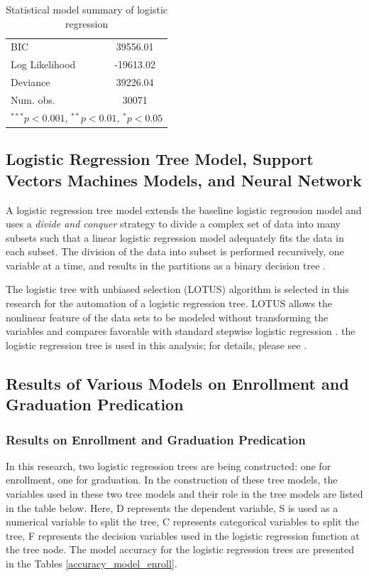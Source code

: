 \documentclass[12pt,english]{report}
\begin{document}
\begin{table}
\begin{center}
\begin{minipage}{0.4\textwidth}
{\begin{tabular}  {l c }
BIC                             & 39556.01      \\
Log Likelihood                  & -19613.02     \\
Deviance                        & 39226.04      \\
Num. obs.                       & 30071         \\
\hline
\multicolumn{2}{l}{\scriptsize{$^{***}p<0.001$, $^{**}p<0.01$, $^*p<0.05$}}
\end{tabular}
}
\end{minipage}
\caption{Statistical model summary of logistic regression}
\label{enroll:logistic_sum}
\end{center}
\end{table}


\subsection{Logistic Regression Tree Model, Support Vectors Machines Models,
and Neural Network }
A logistic regression tree model extends the baseline logistic regression model
and uses a \textit{divide and conquer} strategy to divide  a complex set of
data into many subsets such that a linear logistic regression model adequately
fits the data in each subset. The division of the data into subset is performed
recursively, one variable at a time, and results in the partitions as a binary
decision tree \citep{harrell2013regression_book}.

The logistic tree with unbiased selection (LOTUS) algorithm \citep{lotus2}  is
selected in this research for the automation of a logistic regression tree.
LOTUS allows the nonlinear feature of the data sets to be modeled without
transforming the variables and compares favorable with standard stepwise
logistic regression \citep{lotus_app1,lotus_app2}. %
the logistic regression tree is used in this analysis; for details, please see
\citep{lotus2}.


\subsection{Results of Various Models on Enrollment and Graduation Predication}
\subsubsection{Results on Enrollment and Graduation Predication}

In this research, two logistic regression trees are being constructed: one for
enrollment, one for graduation.  In the construction of these tree models, the
variables used in these two tree models and their role in the tree models are
listed in the table below. Here, D represents the dependent variable, S is used
as a numerical variable to split the tree, C represents categorical variables
to split the tree, F represents the decision variables used in the logistic
regression function at the tree node.  The model accuracy for the logistic
regression trees are presented in the Tables \ref{accuracy_model_enroll}.
\end{document}
